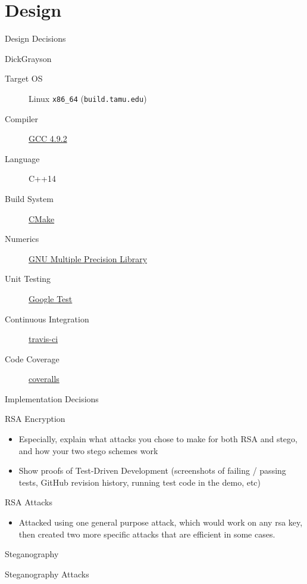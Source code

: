 \documentclass[presentation]{beamer}
\begin{document}
\section{Design}
\label{sec:orgheadline1}
\begin{frame}[fragile,label=sec-2-1]{Design Decisions}
 \begin{block}{DickGrayson}
\begin{description}
\item[{Target OS}] Linux \texttt{x86\_64} (\texttt{build.tamu.edu})
\item[{Compiler}] \href{https://gcc.gnu.org/}{GCC 4.9.2}
\item[{Language}] C++14
\item[{Build System}] \href{https://cmake.org}{CMake}
\item[{Numerics}] \href{https://gmplib.org}{GNU Multiple Precision Library}
\item[{Unit Testing}] \href{https://code.google.com/p/googletest/}{Google Test}
\item[{Continuous Integration}] \href{http://travis-ci.org}{travis-ci}
\item[{Code Coverage}] \href{http://coveralls.io}{coveralls}
\end{description}
\end{block}
\end{frame}
\begin{frame}[label=sec-2-2]{Implementation Decisions}
\begin{block}{RSA Encryption}
\begin{itemize}
\item Especially, explain what attacks you chose to make for both RSA and stego, and
how your two stego schemes work
\item Show proofs of Test-Driven Development (screenshots of failing / passing
tests, GitHub revision history, running test code in the demo, etc)
\end{itemize}
\end{block}
\begin{block}{RSA Attacks}
\begin{itemize}
\item Attacked using one general purpose attack, which would work on any rsa key, 
then created two more specific attacks that are efficient in some cases.
\end{itemize}
\end{block}

\begin{block}{Steganography}
\end{block}
\begin{block}{Steganography Attacks}
\end{block}
\end{frame}
\end{document}
